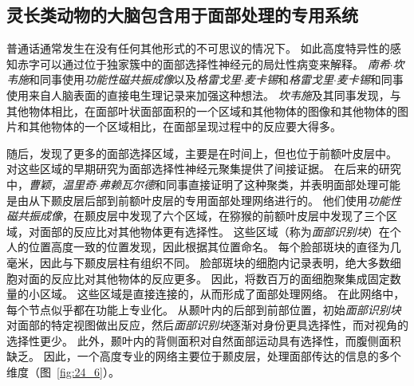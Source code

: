 \subsection{灵长类动物的大脑包含用于面部处理的专用系统}

普通话通常发生在没有任何其他形式的不可思议的情况下。
如此高度特异性的感知赤字可以通过位于独家簇中的面部选择性神经元的局灶性病变来解释。
\textit{南希$\cdot$坎韦施}和同事使用\textit{功能性磁共振成像}以及\textit{格雷戈里$\cdot$麦卡锡}和\textit{格雷戈里$\cdot$麦卡锡}和同事使用来自人脑表面的直接电生理记录来加强这种想法。
\textit{坎韦施}及其同事发现，与其他物体相比，在面部叶状面部面积的一个区域和其他物体的图像和其他物体的图片和其他物体的一个区域相比，在面部呈现过程中的反应要大得多。


随后，发现了更多的面部选择区域，主要是在时间上，但也位于前额叶皮层中。
对这些区域的早期研究为面部选择性神经元聚集提供了间接证据。
在后来的研究中，\textit{曹颖}，\textit{温里奇$\cdot$弗赖瓦尔德}和同事直接证明了这种聚类，并表明面部处理可能是由从下颞皮层后部到前额叶皮层的专用面部处理网络进行的。
他们使用\textit{功能性磁共振成像}，在颞皮层中发现了六个区域，在猕猴的前额叶皮层中发现了三个区域，对面部的反应比对其他物体更有选择性。
这些区域（称为\textit{面部识别块}）在个人的位置高度一致的位置发现，因此根据其位置命名。
每个脸部斑块的直径为几毫米，因此与下颞皮层柱有组织不同。
脸部斑块的细胞内记录表明，绝大多数细胞对面的反应比对其他物体的反应更多。
因此，将数百万的面细胞聚集成固定数量的小区域。
这些区域是直接连接的，从而形成了面部处理网络。
在此网络中，每个节点似乎都在功能上专业化。
从颞叶内的后部到前部位置，初始\textit{面部识别块}对面部的特定视图做出反应，然后\textit{面部识别块}逐渐对身份更具选择性，而对视角的选择性更少。 
此外，颞叶内的背侧面积对自然面部运动具有选择性，而腹侧面积缺乏。
因此，一个高度专业的网络主要位于颞皮层，处理面部传达的信息的多个维度（图~\ref{fig:24_6}）。


